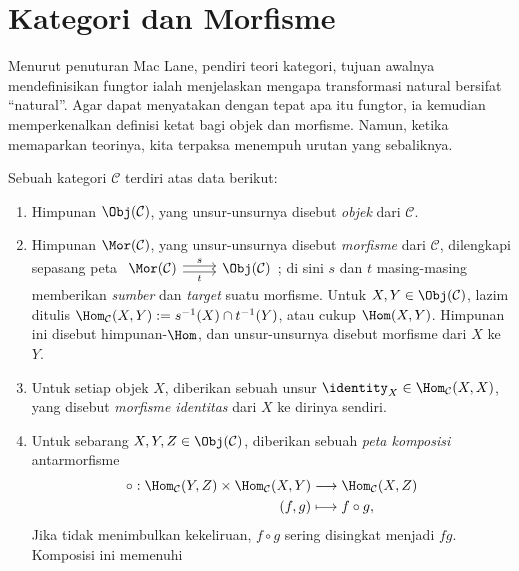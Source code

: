 \section{Kategori dan Morfisme}\label{sec:cat-and-morphism}
Menurut penuturan Mac Lane, pendiri teori kategori, tujuan awalnya mendefinisikan fungtor ialah menjelaskan mengapa transformasi natural bersifat ``natural''. Agar dapat menyatakan dengan tepat apa itu fungtor, ia kemudian memperkenalkan definisi ketat bagi objek dan morfisme. Namun, ketika memaparkan teorinya, kita terpaksa menempuh urutan yang sebaliknya.

\begin{definition}\label{def:category}
	Sebuah kategori $\mathcal{C}$ terdiri atas data berikut:
	\begin{enumerate}
		\item Himpunan $\Obj(\mathcal{C})$, yang unsur-unsurnya disebut \emph{objek} dari $\mathcal{C}$.
		\item Himpunan $\Mor(\mathcal{C})$, yang unsur-unsurnya disebut \emph{morfisme} dari $\mathcal{C}$, dilengkapi sepasang peta $\begin{tikzcd} \Mor(\mathcal{C}) \arrow[yshift=-0.5ex, r, "t"'] \arrow[yshift=0.5ex, r, "s"] & \Obj(\mathcal{C}) \end{tikzcd}$; di sini $s$ dan $t$ masing-masing memberikan \emph{sumber} dan \emph{target} suatu morfisme. Untuk $X, Y \in \Obj(\mathcal{C})$, lazim ditulis $\Hom_{\mathcal{C}}(X, Y) := s^{-1}(X) \cap t^{-1}(Y)$, atau cukup $\Hom(X, Y)$. Himpunan ini disebut himpunan-$\Hom$, dan unsur-unsurnya disebut morfisme dari $X$ ke $Y$.
		\item Untuk setiap objek $X$, diberikan sebuah unsur $\identity_X \in \Hom_{\mathcal{C}}(X, X)$, yang disebut \emph{morfisme identitas} dari $X$ ke dirinya sendiri.
		\item Untuk sebarang $X, Y, Z \in \Obj(\mathcal{C})$, diberikan sebuah \emph{peta komposisi} antarmorfisme
		\begin{align*}
			\circ : \Hom_{\mathcal{C}}(Y, Z) \times \Hom_{\mathcal{C}}(X, Y) & \longrightarrow \Hom_{\mathcal{C}}(X, Z) \\
			(f, g) & \longmapsto f \circ g,
		\end{align*}
		Jika tidak menimbulkan kekeliruan, $f \circ g$ sering disingkat menjadi $fg$. Komposisi ini memenuhi

\end{enumerate}
\end{definition}

